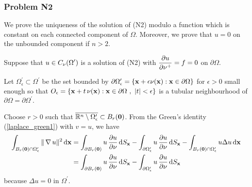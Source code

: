 \subsubsection{Problem N2}
We prove the uniqueness of the solution of (N2) modulo a
function which is constant on each connected component of $\Omega$.
Moreover, we prove that $u=0$ on the unbounded component if $n>2$.

Suppose that $\displaystyle u \in C_{\mathbf{\nu}}(\Omega^{\prime})$ is a
solution of (N2) with $\displaystyle \frac{\partial{u}}{\partial \mathbf{\nu}^+} = f = 0$ on
$\partial \Omega$.

Let $\displaystyle \Omega^{\prime}_\epsilon \subset \Omega^{\prime}$
be the set bounded by $\partial \Omega^{\prime}_\epsilon
= \{ \mathbf{x} + \epsilon \mathbf{\nu}(\mathbf{x}) : \mathbf{x}
\in \partial \Omega \}$ for $\epsilon>0$ small enough
so that
$\displaystyle
O_{\epsilon} = \left\{ \mathbf{x} + t\, \mathbf{\nu}(\mathbf{x}) : \mathbf{x} \in
  \partial \Omega \ , \ |t|<\epsilon \right\}$ is a tubular
neighbourhood of $\displaystyle \partial \Omega = \partial \Omega^{\prime}$.

Choose $r>0$ such that
$\displaystyle \overline{\mathbb{R}^n \setminus \Omega^{\prime}_\epsilon}
\subset B_r(\mathbf{0})$.
From the Green's identity (\ref{laplace_green1}) with $v=u$, we have
\begin{align}
\int_{B_r(\mathbf{0})\cap\Omega^{\prime}_\epsilon} \| \operatorname{\nabla} u \|^2 \,\mathrm{d}{\mathbf{x}} &=
\int_{\partial B_r(\mathbf{0})} u\,\frac{\partial{u}}{\partial \mathbf{\nu}} \,\mathrm{d}{S}_{\mathbf{x}}
- \int_{\partial \Omega^{\prime}_\epsilon} u\,\frac{\partial{u}}{\partial \mathbf{\nu}} \,\mathrm{d}{S}_{\mathbf{x}}
- \int_{B_r(\mathbf{0})\cap\Omega^{\prime}_\epsilon} u \Delta u \,\mathrm{d}{\mathbf{x}}
\nonumber \\
&= \int_{\partial B_r(\mathbf{0})} u\,\frac{\partial{u}}{\partial \mathbf{\nu}} \,\mathrm{d}{S}_{\mathbf{x}}
- \int_{\partial \Omega^{\prime}_\epsilon} u\,\frac{\partial{u}}{\partial \mathbf{\nu}} \,\mathrm{d}{S}_{\mathbf{x}}
\label{potN2Eq1}
\end{align}
because $\Delta u =0$ in $\displaystyle \Omega^{\prime}$.

